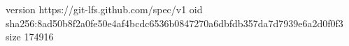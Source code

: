 version https://git-lfs.github.com/spec/v1
oid sha256:8ad50b8f2a0fe50e4af4bcdc6536b0847270a6dbfdb357da7d7939e6a2d0f0f3
size 174916
